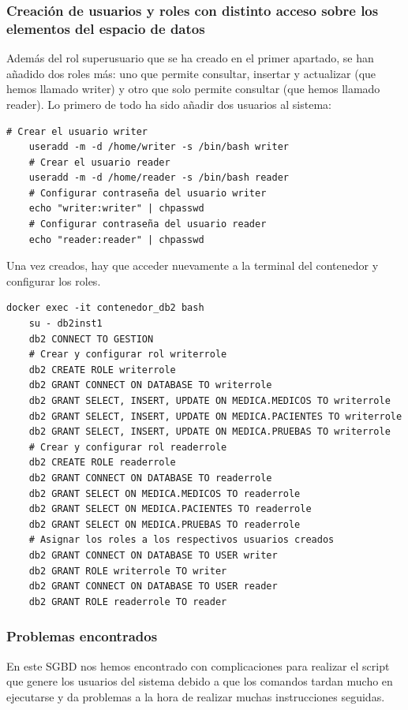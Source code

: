 \documentclass{article}
\begin{document}
\subsubsection{Creación	de usuarios y roles con	distinto acceso	sobre los elementos	del espacio	de datos}
Además del rol superusuario que se ha creado en el primer apartado, se han añadido dos roles más: uno que permite consultar, insertar y actualizar (que hemos llamado writer) y otro que solo permite consultar (que hemos llamado reader).
Lo primero de todo ha sido añadir dos usuarios al sistema:
\begin{lstlisting}[style=bashStyle]
    # Crear el usuario writer
    useradd -m -d /home/writer -s /bin/bash writer
    # Crear el usuario reader
    useradd -m -d /home/reader -s /bin/bash reader
    # Configurar contraseña del usuario writer
    echo "writer:writer" | chpasswd
    # Configurar contraseña del usuario reader
    echo "reader:reader" | chpasswd
\end{lstlisting}
Una vez creados, hay que acceder nuevamente a la terminal del contenedor y configurar los roles.
\begin{lstlisting}[style=bashStyle]
    docker exec -it contenedor_db2 bash
    su - db2inst1
    db2 CONNECT TO GESTION
    # Crear y configurar rol writerrole
    db2 CREATE ROLE writerrole
    db2 GRANT CONNECT ON DATABASE TO writerrole
    db2 GRANT SELECT, INSERT, UPDATE ON MEDICA.MEDICOS TO writerrole
    db2 GRANT SELECT, INSERT, UPDATE ON MEDICA.PACIENTES TO writerrole
    db2 GRANT SELECT, INSERT, UPDATE ON MEDICA.PRUEBAS TO writerrole
    # Crear y configurar rol readerrole
    db2 CREATE ROLE readerrole
    db2 GRANT CONNECT ON DATABASE TO readerrole
    db2 GRANT SELECT ON MEDICA.MEDICOS TO readerrole
    db2 GRANT SELECT ON MEDICA.PACIENTES TO readerrole
    db2 GRANT SELECT ON MEDICA.PRUEBAS TO readerrole
    # Asignar los roles a los respectivos usuarios creados
    db2 GRANT CONNECT ON DATABASE TO USER writer
    db2 GRANT ROLE writerrole TO writer
    db2 GRANT CONNECT ON DATABASE TO USER reader
    db2 GRANT ROLE readerrole TO reader
\end{lstlisting}

\subsubsection{Problemas encontrados}
En este SGBD nos hemos encontrado con complicaciones para realizar el script que genere los usuarios del sistema debido a que los comandos tardan mucho en ejecutarse y da problemas a la hora de realizar muchas instrucciones seguidas.
\end{document}
